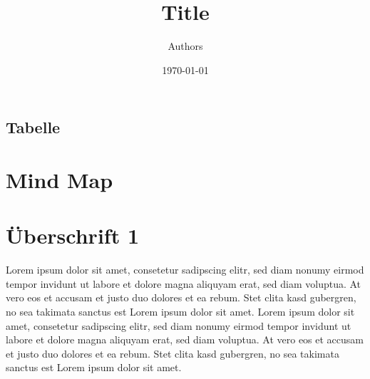 \documentclass{article}
\title{Title}									%
\author{Authors}								%
\date{\today}														%
\begin{document}

\maketitle 										%
\thispagestyle{fancy}							%


\pagebreak

\tableofcontents 

\pagebreak

\subsection{Tabelle}


\section{Mind Map}
\pagebreak


\section{Überschrift 1}
Lorem ipsum dolor sit amet, consetetur sadipscing elitr, sed diam nonumy eirmod tempor invidunt ut labore et dolore magna aliquyam erat, sed diam voluptua. At vero eos et accusam et justo duo dolores et ea rebum. Stet clita kasd gubergren, no sea takimata sanctus est Lorem ipsum dolor sit amet. Lorem ipsum dolor sit amet, consetetur sadipscing elitr, sed diam nonumy eirmod tempor invidunt ut labore et dolore magna aliquyam erat, sed diam voluptua. At vero eos et accusam et justo duo dolores et ea rebum. Stet clita kasd gubergren, no sea takimata sanctus est Lorem ipsum dolor sit amet.
\end{document}
